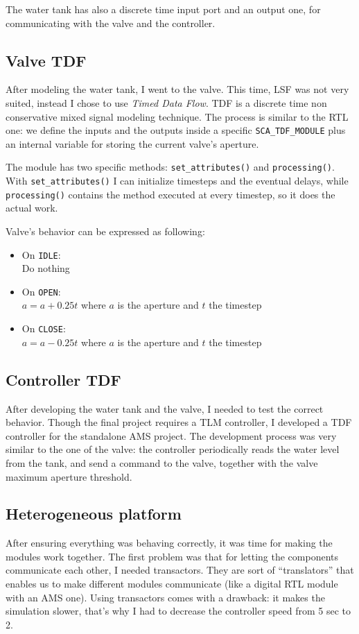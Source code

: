 \documentclass[]{IEEEtran}
\begin{document}
The water tank has also a discrete time input port and an output one, for communicating with the valve and the controller.

\subsection{Valve TDF}
After modeling the water tank, I went to the valve. This time, LSF was not very suited, instead I chose to use \textit{Timed Data Flow}.
TDF is a discrete time non conservative mixed signal modeling technique. The process is similar to the RTL one: we define the inputs and the outputs
inside a specific \texttt{SCA\_TDF\_MODULE} plus an internal variable for storing the current valve's aperture.

The module has two specific methods: \texttt{set\_attributes()} and \texttt{processing()}.
With \texttt{set\_attributes()} I can initialize timesteps and the eventual delays, while \texttt{processing()} contains the method executed at every timestep,
so it does the actual work.

Valve's behavior can be expressed as following:
\begin{itemize}
    \item On \texttt{IDLE}:\\
    Do nothing
    \item On \texttt{OPEN}:\\
    $a=a+0.25t$ where $a$ is the aperture and $t$ the timestep
    \item On \texttt{CLOSE}:\\
    $a=a-0.25t$ where $a$ is the aperture and $t$ the timestep
\end{itemize}

\subsection{Controller TDF}
After developing the water tank and the valve, I needed to test the correct behavior. Though the final project requires a TLM controller, I developed a TDF controller
for the standalone AMS project.
The development process was very similar to the one of the valve: the controller periodically reads the water level from the tank, and send a command to the valve, together
with the valve maximum aperture threshold.

\subsection{Heterogeneous platform}
After ensuring everything was behaving correctly, it was time for making the modules work together.
The first problem was that for letting the components communicate each other, I needed transactors.
They are sort of ``translators'' that enables us to make different modules communicate (like a digital RTL module with an AMS one).
Using transactors comes with a drawback: it makes the simulation slower, that's why I had to decrease the controller speed from 5 sec to 2.
\end{document}
